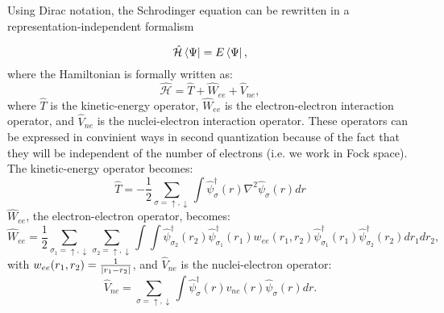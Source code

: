 Using Dirac notation, the Schrodinger equation can be rewritten in
a representation-independent formalism

\begin{equation}
  \hat{\mathcal{H}}\bra{\Psi}=E\bra{\Psi},
\end{equation}
where the Hamiltonian is formally written as:
\begin{equation}
  \hat{\mathcal{H}}=\hat{T}+\hat{W}_{ee}+\hat{V}_{ne},
\end{equation}
where $\hat{T}$ is the kinetic-energy operator, $\hat{W}_{ee}$ is the
electron-electron interaction operator, and $\hat{V}_{ne}$ is the
nuclei-electron interaction operator. These operators can be expressed in
convinient ways in second quantization because of the fact that they will be
independent of the number of electrons (i.e. we work in Fock space). The
kinetic-energy operator becomes:
\begin{equation}
  \hat{T}
  = - \frac{1}{2}\sum_{\sigma=\uparrow,\downarrow}\int{\hat{\psi}^\dagger_\sigma(r)\nabla^2\hat{\psi}_\sigma(r)dr}
\end{equation}
$\hat{W}_{ee}$, the electron-electron operator, becomes:
\begin{equation}
  \hat{W}_{ee}
  = \frac{1}{2}\sum_{\sigma_1=\uparrow,\downarrow}\sum_{\sigma_2=\uparrow,\downarrow}\int\int\hat{\psi}^\dagger_{\sigma_2}(r_2)\hat{\psi}^\dagger_{\sigma_1}(r_1)w_{ee}(r_1,r_2)\hat{\psi}^\dagger_{\sigma_1}(r_1)\hat{\psi}^\dagger_{\sigma_2}(r_2)dr_1dr_2,
\end{equation}
with $w_{ee}(r_1,r_2) = \frac{1}{\abs{r_1-r_2}}$, and $\hat{V}_{ne}$ is the
nuclei-electron operator:
\begin{equation}
  \hat{V}_{ne}
  = \sum_{\sigma=\uparrow,\downarrow}\int\hat{\psi}^\dagger_\sigma(r)v_{ne}(r)\hat{\psi}_{\sigma}(r)dr.
\end{equation}
